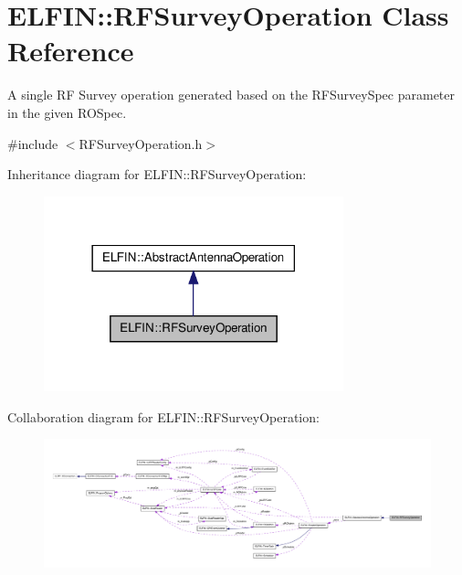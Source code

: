 \hypertarget{class_e_l_f_i_n_1_1_r_f_survey_operation}{\section{E\-L\-F\-I\-N\-:\-:R\-F\-Survey\-Operation Class Reference}
\label{class_e_l_f_i_n_1_1_r_f_survey_operation}
}


A single R\-F Survey operation generated based on the R\-F\-Survey\-Spec parameter in the given R\-O\-Spec.  




{\ttfamily \#include $<$R\-F\-Survey\-Operation.\-h$>$}



Inheritance diagram for E\-L\-F\-I\-N\-:\-:R\-F\-Survey\-Operation\-:
\nopagebreak
\begin{figure}[H]
\begin{center}
\leavevmode
\includegraphics[width=246pt]{class_e_l_f_i_n_1_1_r_f_survey_operation__inherit__graph}
\end{center}
\end{figure}


Collaboration diagram for E\-L\-F\-I\-N\-:\-:R\-F\-Survey\-Operation\-:
\nopagebreak
\begin{figure}[H]
\begin{center}
\leavevmode
\includegraphics[width=350pt]{class_e_l_f_i_n_1_1_r_f_survey_operation__coll__graph}
\end{center}
\end{figure}
